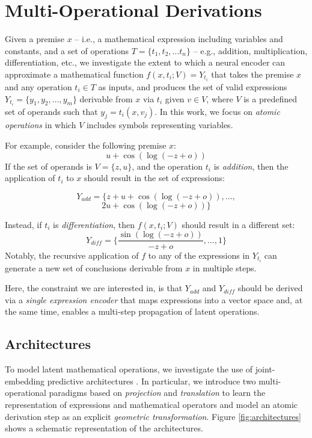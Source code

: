 \documentclass[11pt]{article}
\begin{document}

\section{Multi-Operational Derivations}
\label{sec:multi_operational_inference}
Given a premise $x$ -- i.e., a mathematical expression including variables and constants, and a set of operations $T = \{t_1, t_2, \ldots t_n\}$ -- e.g., addition, multiplication, differentiation, etc., we investigate the extent to which a neural encoder can approximate a mathematical function $f(x,t_i;V) = Y_{t_i}$ that takes the premise $x$ and any operation $t_i \in T$ as inputs, and produces the set of valid expressions $Y_{t_i} = \{y_1, y_2, \ldots, y_m\}$ derivable from $x$ via $t_i$ given $v \in V$, where $V$ is a predefined set of operands such that $y_j = t_i(x, v_j)$. In this work, we focus on \emph{atomic operations} in which $V$ includes symbols representing variables. %

For example, consider the following premise $x$: $$u + \cos{(\log{(- z + o)})}$$ 
If the set of operands is $V =\{z,u\}$, and the operation $t_i$ is \emph{addition}, then the application of $t_i$ to $x$ should result in the set of expressions:

$$Y_{add} = \{z + u + \cos{(\log{(- z + o)})}, \ldots, $$$$ 2 u + \cos{(\log{(- z + o)})}\}$$

Instead, if $t_i$ is \emph{differentiation}, then $f(x,t_i;V)$ should result in a different set: $$Y_{diff} = \{ \frac{\sin{(\log{(- z + o)})}}{- z + o}, \ldots, 1\}$$
Notably, the recursive application of $f$ to any of the expressions in $Y_{t_i}$ can generate a new set of conclusions derivable from $x$ in multiple steps.

Here, the constraint we are interested in, is that $Y_{add}$ and $Y_{diff}$ should be derived via a \emph{single expression encoder} that maps expressions into a vector space and, at the same time, enables a multi-step propagation of latent operations.

\subsection{Architectures}
\label{sec:jepa}
To model latent mathematical operations, we investigate the use of joint-embedding predictive architectures \cite{lecun2022path}. In particular, we introduce two multi-operational paradigms based on \emph{projection} and \emph{translation} to learn the representation of expressions and mathematical operators and model an atomic derivation step as an explicit \emph{geometric transformation}. 
Figure \ref{fig:architectures} shows a schematic representation of the architectures.
\end{document}
